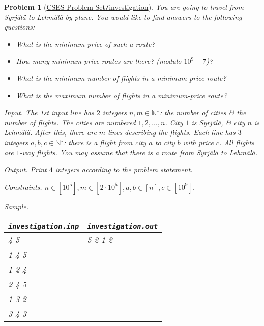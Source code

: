 \documentclass{article}
\newtheorem{problem}{Problem}
\begin{document}
\begin{problem}[\href{https://cses.fi/problemset/task/1202}{CSES Problem Set{\tt/}investigation}]
    You are going to travel from Syrjälä to Lehmälä by plane. You would like to find answers to the following questions:
    \begin{itemize}
        \item What is the minimum price of such a route?
        \item How many minimum-price routes are there? (modulo $10^9 + 7$)?
        \item What is the minimum number of flights in a minimum-price route?
        \item What is the maximum number of flights in a minimum-price route?
    \end{itemize}
    \item {\sf Input.} The 1st input line has $2$ integers $n,m\in\mathbb{N}^\star$: the number of cities \& the number of flights. The cities are numbered $1,2,\ldots,n$. City $1$ is Syrjälä, \& city $n$ is Lehmälä. After this, there are $m$ lines describing the flights. Each line has $3$ integers $a,b,c\in\mathbb{N}^\star$: there is a flight from city $a$ to city $b$ with price $c$. All flights are $1$-way flights. You may assume that there is a route from Syrjälä to Lehmälä.
    \item {\sf Output.} Print $4$ integers according to the problem statement.
    \item {\sf Constraints.} $n\in[10^5],m\in[2\cdot10^5],a,b\in[n],c\in[10^9]$.
    \item {\sf Sample.}
    \begin{table}[H]
        \centering
        \begin{tabular}{|l|l|}
            \hline
            \verb|investigation.inp| & \verb|investigation.out| \\
            \hline
            4 5 & 5 2 1 2 \\
            1 4 5 & \\
            1 2 4 & \\
            2 4 5 & \\
            1 3 2 & \\
            3 4 3 & \\
            \hline
        \end{tabular}
    \end{table}
\end{problem}
\end{document}
